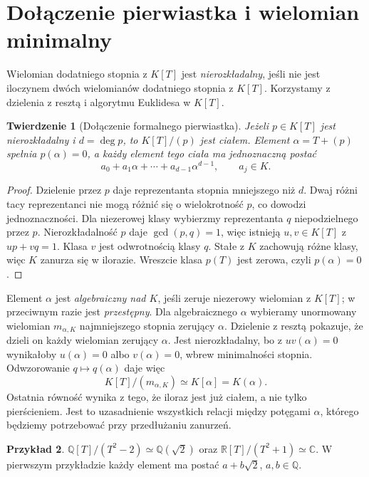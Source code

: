 \documentclass[11pt,a4paper,oneside]{book}
\numberwithin{equation}{section}
\theoremstyle{plain}
\newtheorem{twierdzenie}{Twierdzenie}[chapter]
\theoremstyle{definition}
\newtheorem{przyklad}[twierdzenie]{Przykład}
\theoremstyle{remark}
\newcommand{\Q}{\mathbb{Q}}
\newcommand{\R}{\mathbb{R}}
\newcommand{\C}{\mathbb{C}}
\begin{document}
\section{Dołączenie pierwiastka i wielomian minimalny}

Wielomian dodatniego stopnia z $K[T]$ jest \emph{nierozkładalny}, jeśli nie jest iloczynem dwóch wielomianów dodatniego stopnia z $K[T]$. Korzystamy z dzielenia z resztą i algorytmu Euklidesa w $K[T]$.

\begin{twierdzenie}[Dołączenie formalnego pierwiastka]
Jeżeli $p\in K[T]$ jest nierozkładalny i $d=\deg p$, to $K[T]/(p)$ jest ciałem. Element $\alpha=T+(p)$ spełnia $p(\alpha)=0$, a każdy element tego ciała ma jednoznaczną postać
\[
a_0+a_1\alpha+\cdots+a_{d-1}\alpha^{d-1},\qquad a_j\in K.
\]
\end{twierdzenie}
\begin{proof}
Dzielenie przez $p$ daje reprezentanta stopnia mniejszego niż $d$. Dwaj różni tacy reprezentanci nie mogą różnić się o wielokrotność $p$, co dowodzi jednoznaczności. Dla niezerowej klasy wybierzmy reprezentanta $q$ niepodzielnego przez $p$. Nierozkładalność $p$ daje $\gcd(p,q)=1$, więc istnieją $u,v\in K[T]$ z $up+vq=1$. Klasa $v$ jest odwrotnością klasy $q$. Stałe z $K$ zachowują różne klasy, więc $K$ zanurza się w ilorazie. Wreszcie klasa $p(T)$ jest zerowa, czyli $p(\alpha)=0$.
\end{proof}

Element $\alpha$ jest \emph{algebraiczny nad $K$}, jeśli zeruje niezerowy wielomian z $K[T]$; w przeciwnym razie jest \emph{przestępny}. Dla algebraicznego $\alpha$ wybieramy unormowany wielomian $m_{\alpha,K}$ najmniejszego stopnia zerujący $\alpha$. Dzielenie z resztą pokazuje, że dzieli on każdy wielomian zerujący $\alpha$. Jest nierozkładalny, bo z $uv(\alpha)=0$ wynikałoby $u(\alpha)=0$ albo $v(\alpha)=0$, wbrew minimalności stopnia. Odwzorowanie $q\mapsto q(\alpha)$ daje więc
\[
K[T]/(m_{\alpha,K})\simeq K[\alpha]=K(\alpha).
\]
Ostatnia równość wynika z tego, że iloraz jest już ciałem, a nie tylko pierścieniem. Jest to uzasadnienie wszystkich relacji między potęgami $\alpha$, którego będziemy potrzebować przy przedłużaniu zanurzeń.

\begin{przyklad}
$\Q[T]/(T^2-2)\simeq\Q(\sqrt2)$ oraz $\R[T]/(T^2+1)\simeq\C$. W pierwszym przykładzie każdy element ma postać $a+b\sqrt2$, $a,b\in\Q$.
\end{przyklad}
\end{document}

